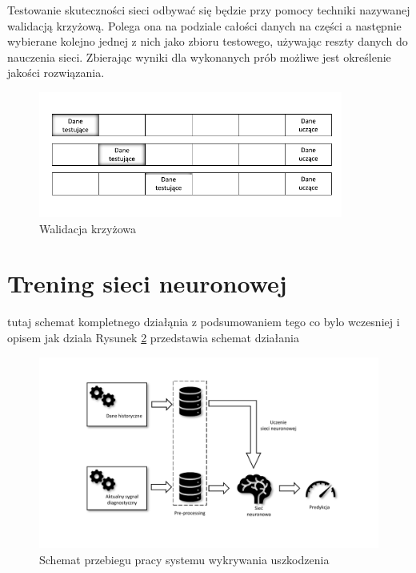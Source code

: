 \documentclass[inzynierska]{pwr_wmat_praca_dyplomowa}
\theoremstyle{plain}
\numberwithin{theorem}{chapter}
\theoremstyle{definition}
\numberwithin{theorem}{chapter}
\begin{document}
Testowanie skuteczności sieci odbywać się będzie przy pomocy techniki nazywanej walidacją krzyżową. Polega ona na podziale całości danych na części a następnie wybierane kolejno jednej z nich jako zbioru testowego, używając reszty danych do nauczenia sieci. Zbierając wyniki dla wykonanych prób możliwe jest określenie jakości rozwiązania. 
\begin{figure}[ht]
	\centering
	\includegraphics[width=10cm]{images/walidacja_c.pdf}
	\caption{Walidacja krzyżowa}
	\label{cross-validation}
\end{figure}

\section{Trening sieci neuronowej}
tutaj schemat kompletnego działąnia z podsumowaniem tego co bylo wczesniej i opisem jak dziala
Rysunek \ref{proces-caly} przedstawia schemat działania
\begin{figure}[ht]
	\centering
	\includegraphics[scale=0.7]{images/total_proc.pdf}
	\caption{Schemat przebiegu pracy systemu wykrywania uszkodzenia}
	\label{proces-caly}
\end{figure}
\end{document}
